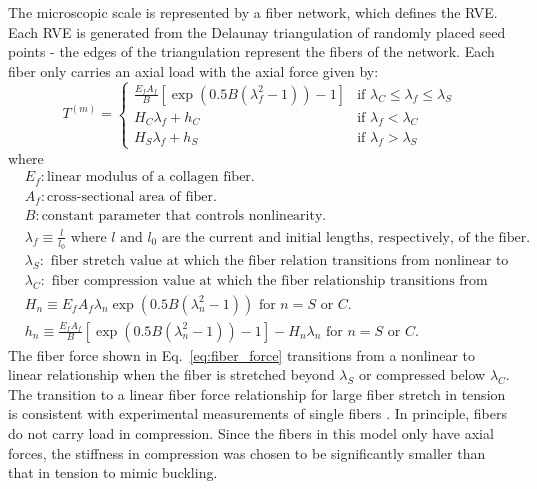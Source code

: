 \documentclass[]{interact}
\begin{document}
The microscopic scale is represented by a fiber network, which defines the RVE. Each RVE is generated from the Delaunay triangulation of randomly placed seed points - the edges of the triangulation represent the fibers of the network. Each fiber only carries an axial load with the axial force given by: 
%
\begin{equation}
T^{(m)} =
\begin{cases}
\frac{E_f A_f}{B} \left[ \exp(0.5 B(\lambda_f^2 - 1)) - 1\right] & \text{if } \lambda_C \le \lambda_f \le \lambda_S \\
H_C  \lambda_f + h_C & \text{if } \lambda_f < \lambda_C \\
H_S \lambda_f + h_S & \text{if } \lambda_f > \lambda_S
\end{cases}
\label{eq:fiber_force}
\end{equation}
%
where 
%
\begin{align*}
&E_f: \text{linear modulus of a collagen fiber.} \\
&A_f: \text{cross-sectional area of fiber.} \\
&B: \text{constant parameter that controls nonlinearity.} \\
&\lambda_f \equiv \frac{l}{l_0} \text{ where } l \text{ and } l_0 \text{ are the current and initial lengths, respectively, of the fiber. } \\
&\lambda_S: \text{ fiber stretch value at which the fiber relation transitions from nonlinear to linear.} \\
&\lambda_C: \text{ fiber compression value at which the fiber relationship transitions from nonlinear to linear.} \\
&H_n \equiv E_f A_f\lambda_n \exp(0.5B(\lambda_n^2 - 1)) \text{ for } n=S \text{ or } C.\nonumber\\
&h_n \equiv \frac{E_f A_f}{B}\left[\exp(0.5 B (\lambda_n^2-1))-1\right] -H_n \lambda_n \text{ for } n=S \text{ or } C. 
\end{align*}
%
The fiber force shown in Eq.\ \eqref{eq:fiber_force} transitions from a nonlinear to linear relationship when the fiber is stretched beyond $\lambda_S$ or compressed below $\lambda_C$. The transition to a linear fiber force relationship for large fiber stretch in tension is consistent with experimental measurements of single fibers \citep{Eppell:2006hh,Svensson:2010fr}. In principle, fibers do not carry load in compression. Since the fibers in this model only have axial forces, the stiffness in compression was chosen to be significantly smaller than that in tension to mimic buckling.
\end{document}
